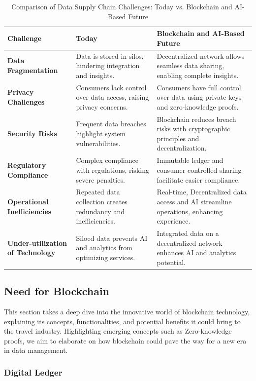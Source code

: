 \documentclass{article}
\begin{document}
\begin{table}[ht]
\centering
\begin{tabular}{|p{4cm}|p{5cm}|p{6cm}|}
\hline
\textbf{Challenge} & \textbf{Today} & \textbf{Blockchain and AI-Based Future} \\
\hline
\textbf{Data Fragmentation} & 
Data is stored in silos, hindering integration and insights. & 
Decentralized network allows seamless data sharing, enabling complete insights. \\
\hline
\textbf{Privacy
Challenges} & 
Consumers lack control over data access, raising privacy concerns. & 
Consumers have full control over data using private keys and zero-knowledge proofs. \\
\hline
\textbf{Security Risks} & 
Frequent data breaches highlight system vulnerabilities. & 
Blockchain reduces breach risks with cryptographic principles and decentralization. \\
\hline
\textbf{Regulatory Compliance} & 
Complex compliance with regulations, risking severe penalties. & 
Immutable ledger and consumer-controlled sharing facilitate easier compliance. \\
\hline
\textbf{Operational Inefficiencies} & 
Repeated data collection creates redundancy and inefficiencies. & 
Real-time, Decentralized data access and AI streamline operations, enhancing experience. \\
\hline
\textbf{Under-utilization of Technology} & 
Siloed data prevents AI and analytics from optimizing services. & 
Integrated data on a decentralized network enhances AI and analytics potential. \\
\hline
\end{tabular}
\caption{Comparison of Data Supply Chain Challenges: Today vs. Blockchain and AI-Based Future}
\label{table:comparison}
\end{table}


\subsection{Need for Blockchain}

This section takes a deep dive into the innovative world of blockchain technology, explaining its concepts, functionalities, and potential benefits it could bring to the travel industry. Highlighting emerging concepts such as Zero-knowledge proofs, we aim to elaborate on how blockchain could pave the way for a new era in data management.

\subsubsection{Digital Ledger}
\end{document}
